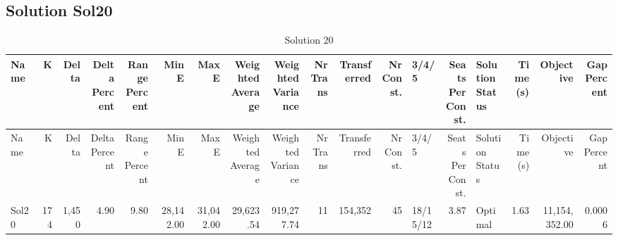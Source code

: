 \documentclass[a4paper]{article}
\begin{document}
\clearpage
\subsection{Solution Sol20}

{\scriptsize
\begin{longtable}{lrrrrrrrrrrrlrlrrr}
\caption{Solution 20}
\\ \toprule
Name &K &Delta &\shortstack{Delta\\Percent} &\shortstack{Range\\Percent} &Min E &Max E &\shortstack{Weighted\\Average} &\shortstack{Weighted\\Variance} &\shortstack{Nr\\Trans} &Transferred &\shortstack{Nr\\Const.} &3/4/5 &\shortstack{Seats\\Per\\Const.} &\shortstack{Solution\\Status} &\shortstack{Time\\(s)} &Objective &\shortstack{Gap\\Percent} \\ \midrule
\endfirsthead
\toprule
Name &K &Delta &\shortstack{Delta\\Percent} &\shortstack{Range\\Percent} &Min E &Max E &\shortstack{Weighted\\Average} &\shortstack{Weighted\\Variance} &\shortstack{Nr\\Trans} &Transferred &\shortstack{Nr\\Const.} &3/4/5 &\shortstack{Seats\\Per\\Const.} &\shortstack{Solution\\Status} &\shortstack{Time\\(s)} &Objective &\shortstack{Gap\\Percent} \\ \midrule
\endhead
\bottomrule
\endfoot
Sol20&174&1,450& 4.90& 9.80&28,142.00&31,042.00&29,623.54&919,277.74&11&154,352&45&18/15/12& 3.87&Optimal& 1.63&11,154,352.00&0.0006\\ 
\end{longtable}

}
\end{document}
